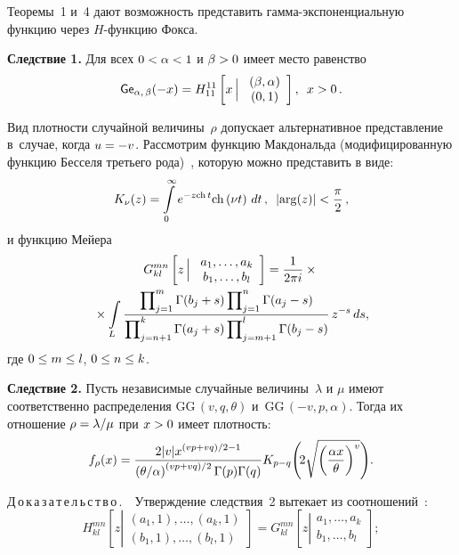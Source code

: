 \begin{multicols}{2}
\columnbreak

\smallskip

Теоремы~1 и~4 дают возможность представить гам\-ма-экспоненциальную функцию через $H$-функ\-цию Фокса.

\smallskip

\noindent
\textbf{Следствие 1.}
Для всех $0\hm< \alpha\hm<1$ и $\beta\hm>0$ имеет место равенство
$$ 
{\sf Ge}_{\alpha,\, \beta}(-x) = H_{11}^{11}
\left[x\, \Big | \
\begin{array}{c}
(\beta,\alpha)\\
(0,1)
\end{array}\right],\enskip x>0\,. 
$$


Вид плотности случайной величины~$\rho$ допускает альтернативное представление в~случае,
 когда $u\hm=-v$. Рассмотрим  функцию Макдональда (модифицированную функцию Бесселя третьего 
 рода)~\cite{GR1971}, которую можно представить в виде:
$$
K_{\nu}(z) = \int\limits_0^{\infty}e^{-z \mathrm{ch}\,t}\mathrm{ch}\left(\nu t\right)\, dt\,, \enskip
 \left| \arg(z)\right|<\displaystyle\frac{\displaystyle \pi\mathstrut}{\displaystyle 2\mathstrut}\,,
 $$
и функцию Мейера~\cite{Prudnikov3}
\begin{multline*}
G_{kl}^{mn}
\left[z\, \Big | \
\begin{array}{c}
a_1,\ldots,a_k\\
b_1,\ldots,b_l
\end{array}\right]=\displaystyle\frac{\displaystyle 1\mathstrut}{\displaystyle 2\pi i\mathstrut}\times{}\\
{}\times \int\limits_L \displaystyle\frac{\displaystyle \prod\nolimits_{j=1}^m\Gamma(b_j+s)\prod\nolimits_{j=1}^n\Gamma(a_j-s)\mathstrut}{\displaystyle \prod\nolimits_{j=n+1}^k\Gamma(a_j+s)\prod\nolimits_{j=m+1}^l\Gamma(b_j-s)\mathstrut}\,z^{-s}\,ds,
\end{multline*}
где $0\le m\hm\le l$, $0\hm\le n\hm\le k$.

\medskip

\noindent
\textbf{Следствие 2.} 
Пусть независимые случайные величины~$\lambda$ и $\mu$ имеют соответственно распределения $\mathrm{GG}\,(v,q,\theta)$ 
и~$\mathrm{GG}\,(-v,p,\alpha)$. Тогда их отношение $\rho\hm=\lambda/\mu$ при $x\hm>0$ имеет плот\-ность:
$$
f_{\rho}(x) =
\displaystyle\frac{\displaystyle 2|v| x^{({vp+vq})/{2}-1}\mathstrut}{\displaystyle \left(\theta/\alpha\right)^{({vp+vq})/{2}}\Gamma(p)\Gamma(q)\mathstrut}
   K_{p-q}\!\left(\!2\sqrt{\left(\displaystyle\frac{\displaystyle \alpha x\mathstrut}{\displaystyle \theta\mathstrut}\right)^v}\right)\!.
$$


\noindent
Д\,о\,к\,а\,з\,а\,т\,е\,л\,ь\,с\,т\,в\,о\,.\ \
 Утверждение следствия~2 вытекает из соотношений~\cite{Prudnikov3}:
$$
H_{k l}^{m n}
    \left[z  \left\vert 
    \begin{array}{c}
    (a_1,1),\ldots,(a_k,1)\\
    (b_1,1),\ldots,(b_l,1)
    \end{array}\right.\right] =
    \displaystyle G_{k l}^{m n}
    \left[z \left\vert 
    \begin{array}{c}
    a_1,\ldots,a_k\\
    b_1,\ldots,b_l
    \end{array}\right.\right]\!;
    $$
    

\end{multicols}
